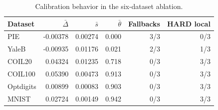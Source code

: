 \begin{table}[t]
\centering
\caption{Calibration behavior in the six-dataset ablation.}\label{tab:ablation6_calibration}
\small
\begin{tabular}{lrrrrr}
\toprule
Dataset & $\bar\Delta$ & $\bar s$ & $\bar\theta$ & Fallbacks & HARD local \\
\midrule
PIE & -0.00378 & 0.00274 & 0.000 & 3/3 & 0/3 \\
YaleB & -0.00935 & 0.01176 & 0.021 & 2/3 & 1/3 \\
COIL20 & 0.04324 & 0.01235 & 0.718 & 0/3 & 3/3 \\
COIL100 & 0.05390 & 0.00473 & 0.913 & 0/3 & 3/3 \\
Optdigits & 0.00899 & 0.00083 & 0.903 & 0/3 & 3/3 \\
MNIST & 0.02724 & 0.00149 & 0.942 & 0/3 & 3/3 \\
\bottomrule
\end{tabular}
\end{table}
